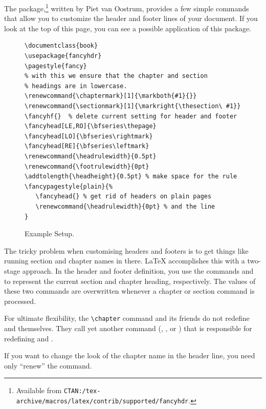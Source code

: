 The  package,\footnote{Available from
  \texttt{CTAN:/tex-archive/macros/latex/contrib/supported/fancyhdr}.} written by
Piet van Oostrum, provides a few simple commands that allow you to
customize the header and footer lines of your document.  If you look
at the top of this page, you can see a possible application of this
package.

\begin{figure}[!htbp]
\begin{lined}{\textwidth}
\begin{verbatim}
\documentclass{book}
\usepackage{fancyhdr}
\pagestyle{fancy}
% with this we ensure that the chapter and section
% headings are in lowercase.
\renewcommand{\chaptermark}[1]{\markboth{#1}{}}
\renewcommand{\sectionmark}[1]{\markright{\thesection\ #1}}
\fancyhf{}  % delete current setting for header and footer
\fancyhead[LE,RO]{\bfseries\thepage}
\fancyhead[LO]{\bfseries\rightmark}
\fancyhead[RE]{\bfseries\leftmark}
\renewcommand{\headrulewidth}{0.5pt}
\renewcommand{\footrulewidth}{0pt}
\addtolength{\headheight}{0.5pt} % make space for the rule
\fancypagestyle{plain}{%
   \fancyhead{} % get rid of headers on plain pages
   \renewcommand{\headrulewidth}{0pt} % and the line
}
\end{verbatim}
\end{lined}
\caption{Example  Setup.} \label{fancyhdr}
\end{figure}

The tricky problem when customising headers and footers is to get
things like running section and chapter names in there. \LaTeX{}
accomplishes this with a two-stage approach. In the header and footer
definition, you use the commands  and  to
represent the current section and chapter heading, respectively.
The values of these two commands are overwritten whenever a chapter or
section command is processed. 

For ultimate flexibility, the \verb|\chapter| command and its friends
do not redefine  and  themselves. They call
yet another command (, , or
) that is responsible for redefining 
and .

If you want to change the look of the chapter
name in the header line, you need only ``renew'' the 
command. 

